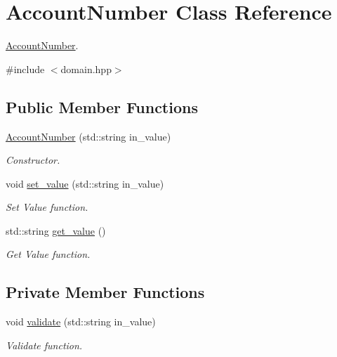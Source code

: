 \hypertarget{classAccountNumber}{}\section{Account\+Number Class Reference}
\label{classAccountNumber}


\hyperlink{classAccountNumber}{Account\+Number}.  




{\ttfamily \#include $<$domain.\+hpp$>$}

\subsection*{Public Member Functions}
\begin{DoxyCompactItemize}
\item 
\hyperlink{classAccountNumber_af96b3289a1091b138cef7df15a2f40b4}{Account\+Number} (std\+::string in\+\_\+value)
\begin{DoxyCompactList}\small\item\em Constructor. \end{DoxyCompactList}\item 
void \hyperlink{classAccountNumber_a8e44f29a45c507e4819fed27ff125037}{set\+\_\+value} (std\+::string in\+\_\+value)
\begin{DoxyCompactList}\small\item\em Set Value function. \end{DoxyCompactList}\item 
std\+::string \hyperlink{classAccountNumber_a9292dbf3e0ccee42c3e66c52ef9afa6d}{get\+\_\+value} ()
\begin{DoxyCompactList}\small\item\em Get Value function. \end{DoxyCompactList}\end{DoxyCompactItemize}
\subsection*{Private Member Functions}
\begin{DoxyCompactItemize}
\item 
void \hyperlink{classAccountNumber_a723fa9aa61240673c9ebc99e7c1a43e7}{validate} (std\+::string in\+\_\+value)
\begin{DoxyCompactList}\small\item\em Validate function. \end{DoxyCompactList}\end{DoxyCompactItemize}
